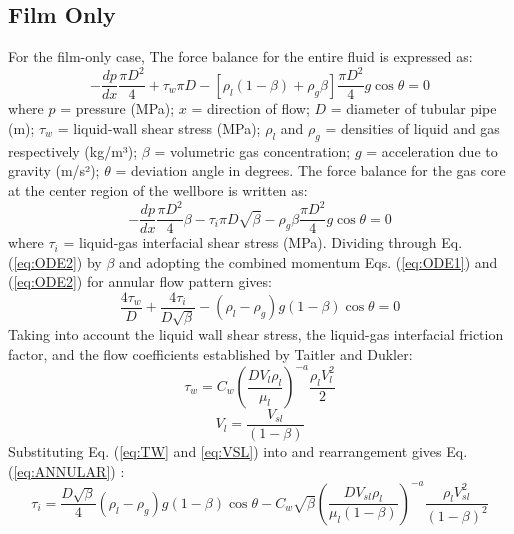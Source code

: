 \documentclass[article.tex]{subfiles}
\begin{document}
\subsection{Film Only}
\label{sec:fil_only-performance}
For the film-only case, The force balance for the entire fluid is expressed as:
\begin{equation}
- \frac{dp}{dx} \frac{\pi D^2}{4} + \tau_w \pi D - \left[ \rho_l (1 - \beta) + \rho_g \beta \right] \frac{\pi D^2}{4} g \cos{\theta} = 0
\label{eq:ODE1}
\end{equation}
\noindent where \( p \) = pressure (MPa); \( x \) = direction of flow; \( D \) = diameter of tubular pipe (m); \( \tau_w \) = liquid-wall shear stress (MPa); \( \rho_l \) and \( \rho_g \) = densities of liquid and gas respectively (kg/m³); \( \beta \) = volumetric gas concentration; \( g \) = acceleration due to gravity (m/s²); \( \theta \) = deviation angle in degrees. The force balance for the gas core at the center region of the wellbore is written as:
\begin{equation}
- \frac{dp}{dx} \frac{\pi D^2}{4} \beta - \tau_i \pi D \sqrt{\beta} - \rho_g \beta \frac{\pi D^2}{4} g \cos{\theta} = 0
\label{eq:ODE2}
\end{equation}
where \( \tau_i \) = liquid-gas interfacial shear stress (MPa). Dividing through Eq. (\ref{eq:ODE2}) by \( \beta \) and adopting the combined momentum Eqs. (\ref{eq:ODE1}) and (\ref{eq:ODE2}) for annular flow pattern gives:
\begin{equation}
\frac{4 \tau_w}{D} + \frac{4 \tau_i}{D \sqrt{\beta}} - (\rho_l - \rho_g) g (1 - \beta) \cos{\theta} = 0
\label{eq:ANNULAR}
\end{equation}
Taking into account the liquid wall shear stress, the liquid-gas interfacial friction factor, and the flow coefficients established by Taitler and Dukler\cite{https://doi.org/10.1002/aic.690220105}:
\begin{equation}
\tau_w = C_w \left( \frac{D V_l \rho_l}{\mu_l} \right)^{-a} \frac{\rho_l V_l^2}{2}
\label{eq:TW}
\end{equation}
\begin{equation}
V_l = \frac{V_{sl}}{(1 - \beta)}
\label{eq:VSL}
\end{equation}
Substituting Eq. (\ref{eq:TW} and \ref{eq:VSL}) into and rearrangement gives Eq. (\ref{eq:ANNULAR}) :
\begin{equation}
\tau_i = \frac{D \sqrt{\beta}}{4} (\rho_l - \rho_g) g (1 - \beta) \cos{\theta} - C_w \sqrt{\beta} \left( \frac{D V_{sl} \rho_l}{\mu_l (1 - \beta)} \right)^{-a} \frac{\rho_l V_{sl}^2}{(1 - \beta)^2}
\label{eq:reArr}
\end{equation}
\end{document}
